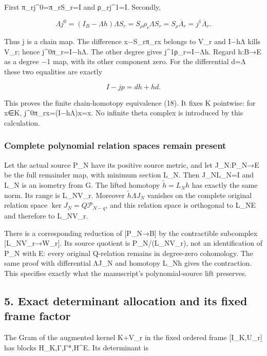 \documentclass[11pt]{article}
\begin{document}
First π\_rj\^{}0=π\_rS\_r=I and ρ\_rj\^{}1=I. Secondly,

\[
\Lambda j^0=(I_B-\Lambda h)\Lambda S_r
=S_\rho\rho_r\Lambda S_r
=S_\rho\overline\Lambda_r=j^1\overline\Lambda_r.
\]

Thus j is a chain map. The difference x−S\_rπ\_rx belongs to V\_r and I−hΛ kills V\_r; hence j\^{}0π\_r=I−hΛ. The other degree gives j\^{}1ρ\_r=I−Λh. Regard h:B→E as a degree −1 map, with its other component zero. For the differential d=Λ these two equalities are exactly

\[
I-jp=dh+hd. \tag{F17b}
\]

This proves the finite chain-homotopy equivalence (18). It fixes K pointwise: for x∈K, j\^{}0π\_rx=(I−hΛ)x=x. No infinite theta complex is introduced by this calculation.

\subsubsection{Complete polynomial relation spaces remain present}\label{complete-polynomial-relation-spaces-remain-present}

Let the actual source P\_N have its positive source metric, and let J\_N:P\_N→E be the full remainder map, with minimum section L\_N. Then J\_NL\_N=I and L\_N is an isometry from G. The lifted homotopy \(\widetilde h=L_Nh\) has exactly the same norm. Its range is L\_NV\_r. Moreover \(\widetilde h\Lambda J_N\) vanishes on the complete original relation space \(\ker J_N=Q\mathcal P_{N-q}\), and this relation space is orthogonal to L\_NE and therefore to L\_NV\_r.

There is a corresponding reduction of {[}P\_N→B{]} by the contractible subcomplex {[}L\_NV\_r→W\_r{]}. Its source quotient is P\_N/(L\_NV\_r), not an identification of P\_N with E: every original Q-relation remains in degree-zero cohomology. The same proof with differential ΛJ\_N and homotopy L\_Nh gives the contraction. This specifies exactly what the manuscript's polynomial-source lift preserves.

\subsection{5. Exact determinant allocation and its fixed frame factor}\label{exact-determinant-allocation-and-its-fixed-frame-factor}

The Gram of the augmented kernel K+V\_r in the fixed ordered frame {[}I\_K,U\_r{]} has blocks H\_K,Γ,Γ*,H\^{}E. Its determinant is
\end{document}
